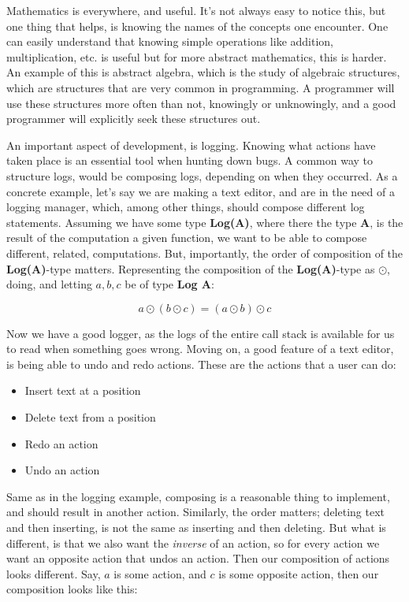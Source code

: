 Mathematics is everywhere, and useful. It's not always easy to notice this, but
one thing that helps, is knowing the names of the concepts one encounter. One
can easily understand that knowing simple operations like addition,
multiplication, etc. is useful but for more abstract mathematics, this is
harder. An example of this is abstract algebra, which is the study of algebraic
structures, which are structures that are very common in programming. A
programmer will use these structures more often than not, knowingly or
unknowingly, and a good programmer will explicitly seek these structures out.

An important aspect of development, is logging. Knowing what actions have taken
place is an essential tool when hunting down bugs. A common way to structure
logs, would be composing logs, depending on when they occurred. As a concrete
example, let's say we are making a text editor, and are in the need of a logging
manager, which, among other things, should compose different log statements.
Assuming we have some type \textbf{Log(A)}, where there the type \textbf{A}, is the
result of the computation a given function, we want to be able to compose
different, related, computations. But, importantly, the order of composition
of the \textbf{Log(A)}-type matters. Representing the composition of the
\textbf{Log(A)}-type as $\odot$, doing, and letting $a, b, c$ be of type
\textbf{Log A}:

\begin{definition} \label{def:logComp}
  \begin{equation}
    a \odot \left ( b \odot c \right ) = \left ( a \odot b \right ) \odot c
  \end{equation}
\end{definition}

Now we have a good logger, as the logs of the entire call stack is available for
us to read when something goes wrong. Moving on, a good feature of a text
editor, is being able to undo and redo actions. These are the actions that a
user can do:

\begin{itemize}
  \item Insert text at a position
  \item Delete text from a position
  \item Redo an action
  \item Undo an action
\end{itemize}

Same as in the logging example, composing is a reasonable thing to implement,
and should result in another action. Similarly, the order matters; deleting text
and then inserting, is not the same as inserting and then deleting. But what is
different, is that we also want the \textit{inverse} of an action, so for every
action we want an opposite action that undos an action. Then our composition of
actions looks different. Say, $a$ is some action, and $c$ is some opposite
action, then our composition looks like this:

